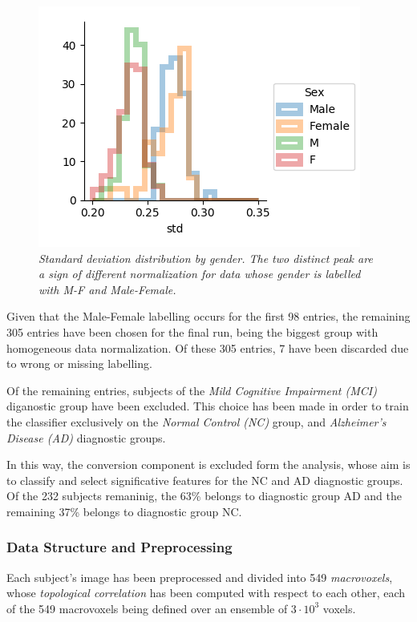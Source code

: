 \documentclass[12pt,openright,twoside,a4paper]{book}
\begin{document}
\begin{figure}[!h]
\centering
\includegraphics[scale=0.75]{ADNi-std-gen}
\caption{\textit{Standard deviation distribution by gender. The two distinct peak are a sign of different normalization for data whose gender is labelled with M-F and Male-Female.}}
\label{std-gen-ADNI}
\end{figure}

Given that the Male-Female labelling occurs for the first 98 entries, the remaining 305 entries have been chosen for the final run, being the biggest group with homogeneous data normalization.
Of these 305 entries, 7 have been discarded due to wrong or missing labelling.

Of the remaining entries, subjects of the \textit{Mild Cognitive Impairment (MCI)} diganostic group have been excluded.
This choice has been made in order to train the classifier exclusively on the \textit{Normal Control (NC)} group, and \textit{Alzheimer's Disease (AD)} diagnostic groups.

In this way, the conversion component is excluded form the analysis, whose aim is to classify and select significative features for the NC and AD diagnostic groups.
Of the 232 subjects remaninig, the 63\% belongs to diagnostic group AD and the remaining 37\% belongs to diagnostic group NC.

\subsubsection*{Data Structure and Preprocessing}

Each subject's image has been preprocessed and divided into 549 \textit{macrovoxels}, whose \textit{topological correlation} has been computed with respect to each other, each of the 549 macrovoxels being defined over an ensemble of $3 \cdot 10^3$ voxels.
\end{document}
